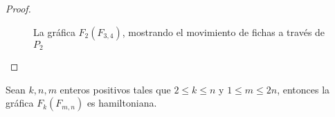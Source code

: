 \begin{proof}
\begin{figure}[ht!]
    
        \caption{La gr\'afica $F_2(F_{3,4})$, mostrando el movimiento de fichas
        a trav\'es de $P_2$ }
        \label{fig:exe-tray-n-m}     
    \end{figure}
\end{proof}


    \begin{teorema}
        Sean $k, n, m$ enteros positivos tales que $2 \leq k \leq n$ y $1 \leq m
        \leq 2n$, entonces la gr\'afica $F_k(F_{m,n})$ es hamiltoniana.
    \end{teorema}

